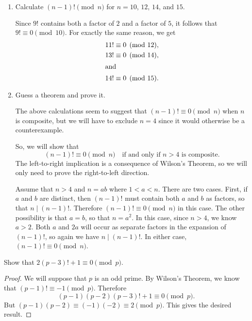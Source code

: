 \begin{enumerate}
\item Calculate $(n - 1)!\pmod{n}$ for $n = 10$, $12$, $14$, and $15$.
  \begin{solution}
    Since $9!$ contains both a factor of $2$ and a factor of $5$, it
    follows that $9!\equiv0\pmod{10}$. For exactly the same reason, we
    get
    \begin{align*}
      11!&\equiv0\pmod{12}, \\
      13!&\equiv0\pmod{14}, \\
      \intertext{and}
      14!&\equiv0\pmod{15}. \qedhere
    \end{align*}
  \end{solution}
\item Guess a theorem and prove it.
  \begin{solution}
    The above calculations seem to suggest that
    $(n - 1)!\equiv0\pmod{n}$ when $n$ is composite, but we will have
    to exclude $n = 4$ since it would otherwise be a counterexample.

    So, we will show that
    \begin{equation*}
      (n - 1)!\equiv0\pmod{n}
      \quad\text{if and only if $n > 4$ is composite}.
    \end{equation*}
    The left-to-right implication is a consequence of Wilson's
    Theorem, so we will only need to prove the right-to-left
    direction.

    Assume that $n > 4$ and $n = ab$ where $1 < a < n$. There are two
    cases. First, if $a$ and $b$ are distinct, then $(n-1)!$ must
    contain both $a$ and $b$ as factors, so that $n\mid(n -
    1)!$. Therefore $(n-1)!\equiv0\pmod{n}$ in this case. The other
    possibility is that $a = b$, so that $n = a^2$. In this case,
    since $n > 4$, we know $a > 2$. Both $a$ and $2a$ will occur as
    separate factors in the expansion of $(n-1)!$, so again we have
    $n\mid(n-1)!$. In either case, $(n-1)!\equiv0\pmod{n}$.
  \end{solution}
\end{enumerate}

 Show that $2(p - 3)! + 1 \equiv 0 \pmod p$.
\begin{proof}
  We will suppose that $p$ is an odd prime. By Wilson's Theorem, we
  know that $(p - 1)!\equiv-1\pmod{p}$. Therefore
  \begin{equation*}
    (p - 1)(p - 2)(p - 3)! + 1 \equiv 0 \pmod{p}.
  \end{equation*}
  But $(p - 1)(p - 2)\equiv(-1)(-2)\equiv2\pmod{p}$. This gives the
  desired result.
\end{proof}

